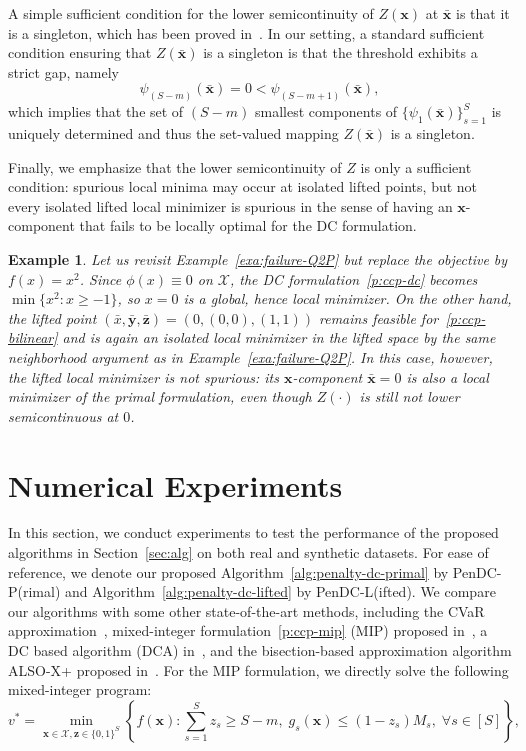 \documentclass[11pt]{article}
\newtheorem{example}[theorem]{Example}
\def\bs{\boldsymbol}
\def\X{\mathcal{X}}
\begin{document}
A simple sufficient condition for the lower semicontinuity of $Z(\bs{x})$ at $\bar{\bs{x}}$ is that it is a singleton, which has been proved in~\cite{burdakov2016mathematical}. In our setting, a standard sufficient condition ensuring that $Z(\bar{\bs{x}})$ is a singleton is that the threshold exhibits a strict gap, namely
\[
\psi_{(S-m)}(\bar{\bs{x}})=0<\psi_{(S-m+1)}(\bar{\bs{x}}),
\]
which implies that the set of $(S-m)$ smallest components of $\{\psi_1(\bar{\bs{x}})\}^S_{s=1}$ is uniquely determined and thus the set-valued mapping $Z(\bar{\bs{x}})$ is a singleton.

Finally, we emphasize that the lower semicontinuity of $Z$ is only a sufficient condition: spurious local minima may occur at isolated lifted points, but not every isolated lifted local minimizer is spurious in the sense of having an $\bs{x}$-component that fails to be locally optimal for the DC formulation.

\begin{example} 
Let us revisit Example~\ref{exa:failure-Q2P} but replace the objective by $f(x)=x^2$. Since $\phi(x)\equiv 0$ on $\X$,
the DC formulation~\eqref{p:ccp-dc} becomes $\min\{x^2:x\ge -1\}$, so $x=0$ is a global, hence local minimizer. On the other hand, the lifted point $(\bar{x},\bar{\bs{y}},\bar{\bs{z}})=(0,(0,0),(1,1))$ remains feasible for~\eqref{p:ccp-bilinear} and is again an isolated local minimizer in the lifted space by the same neighborhood argument as in Example~\ref{exa:failure-Q2P}. In this case, however, the lifted local minimizer is not spurious: its $\bs{x}$-component $\bar{\bs{x}}=0$ is also a local minimizer of the primal formulation, even though $Z(\cdot)$ is still not lower semicontinuous at $0$.
\end{example}

\section{Numerical Experiments}
\label{sec:numerical}

In this section, we conduct experiments to test the performance of the proposed algorithms in Section~\ref{sec:alg} on both real and synthetic datasets. For ease of reference, we denote our proposed Algorithm~\ref{alg:penalty-dc-primal} by PenDC-P(rimal) and Algorithm~\ref{alg:penalty-dc-lifted} by PenDC-L(ifted). We compare our algorithms with some other state-of-the-art methods, including the CVaR approximation~\cite{rockafellar2002conditional,nemirovski2007convex}, mixed-integer formulation~\eqref{p:ccp-mip} (MIP) proposed in~\cite{ahmed2008solving}, a DC based algorithm (DCA) in~\cite{wang2025proximal}, and the bisection-based approximation algorithm ALSO-X+ proposed in~\cite{jiang2022also}. For the MIP formulation, we directly solve the following mixed-integer program:
\begin{equation} \label{p:ccp-mip}
v^* =  \min_{\bs{x} \in \X, \bs{z}\in \{0,1\}^S} \left\{ f(\bs{x}): \sum^S_{s=1}z_s \geq S-m, \; g_s(\bs{x}) \leq (1-z_s)M_s, \;\forall s \in [S]  \right\},
\end{equation}
\end{document}

